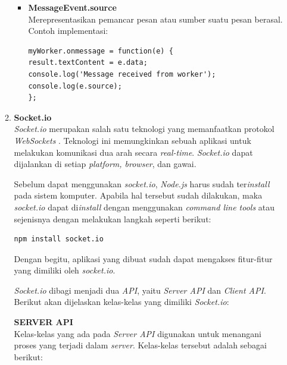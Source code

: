 \documentclass[a4paper,twoside]{article}
\begin{document}
\begin{enumerate}
\begin{enumerate}
\begin{itemize}
				
				\item \textbf{MessageEvent.source} \\ Merepresentasikan pemancar pesan atau sumber suatu pesan berasal. \\
				Contoh implementasi:
\begin{lstlisting}
myWorker.onmessage = function(e) {
result.textContent = e.data;
console.log('Message received from worker');
console.log(e.source);
};
\end{lstlisting}
			\end{itemize}
			
			
			
			
			\item \textbf{Socket.io} \\
			\textit{Socket.io} merupakan salah satu teknologi yang memanfaatkan protokol \textit{WebSockets} \cite{socketio}. Teknologi ini memungkinkan sebuah aplikasi untuk melakukan komunikasi dua arah secara \textit{real-time}. \textit{Socket.io} dapat dijalankan di setiap \textit{platform, browser}, dan gawai.
			
			Sebelum dapat menggunakan \textit{socket.io}, \textit{Node.js} harus sudah ter\textit{install} pada sistem komputer. Apabila hal tersebut sudah dilakukan, maka \textit{socket.io} dapat di\textit{install} dengan menggunakan \textit{command line tools} atau sejenisnya dengan melakukan langkah seperti berikut:
			
\begin{lstlisting}
npm install socket.io
\end{lstlisting}
			
			Dengan begitu, aplikasi yang dibuat sudah dapat mengakses fitur-fitur yang dimiliki oleh \textit{socket.io}.
			
			\textit{Socket.io} dibagi menjadi dua \textit{API}, yaitu \textit{Server API} dan \textit{Client API}. Berikut akan dijelaskan kelas-kelas yang dimiliki \textit{Socket.io}:
			
			\textbf{SERVER API} \\
			Kelas-kelas yang ada pada \textit{Server API} digunakan untuk menangani proses yang terjadi dalam \textit{server}\cite{socketioserver}. Kelas-kelas tersebut adalah sebagai berikut:
			

\end{enumerate}
\end{enumerate}
\end{document}
